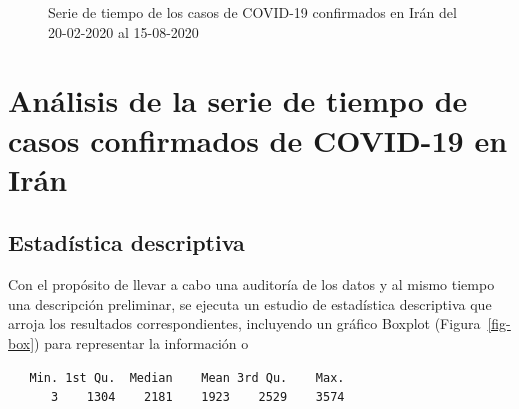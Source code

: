 \documentclass[
  us-letterpaper,
]{scrreprt}
\theoremstyle{plain}
\theoremstyle{definition}
\theoremstyle{plain}
\theoremstyle{definition}
\theoremstyle{remark}
\begin{document}
\begin{figure}


\caption{\label{fig-tspdf}Serie de tiempo de los casos de COVID-19
confirmados en Irán del 20-02-2020 al 15-08-2020}

\end{figure}%

\section{Análisis de la serie de tiempo de casos confirmados de COVID-19
en
Irán}\label{anuxe1lisis-de-la-serie-de-tiempo-de-casos-confirmados-de-covid-19-en-iruxe1n}

\subsection{Estadística descriptiva}\label{estaduxedstica-descriptiva}

Con el propósito de llevar a cabo una auditoría de los datos y al mismo
tiempo una descripción preliminar, se ejecuta un estudio de estadística
descriptiva que arroja los resultados correspondientes, incluyendo un
gráfico Boxplot (Figura~\ref{fig-box}) para representar la información o

\begin{verbatim}
   Min. 1st Qu.  Median    Mean 3rd Qu.    Max. 
      3    1304    2181    1923    2529    3574 
\end{verbatim}
\end{document}
